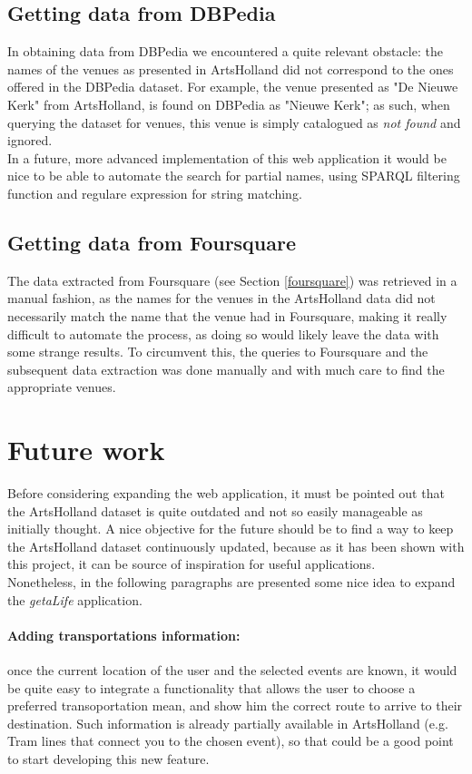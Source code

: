 \documentclass[hidelinks,a4paper]{article}
\begin{document}
\subsection{Getting data from DBPedia}
In obtaining data from DBPedia we encountered a quite relevant obstacle: the names of the venues as presented in ArtsHolland did not correspond to the ones offered in the DBPedia dataset. For example, the venue presented as "De Nieuwe Kerk" from ArtsHolland, is found on DBPedia as "Nieuwe Kerk"; as such, when querying the dataset for venues, this venue is simply catalogued as \textit{not found} and ignored. \\
\indent In a future, more advanced implementation of this web application it would be nice to be able to automate the search for partial names, using SPARQL filtering function and regulare expression for string matching.

\subsection{Getting data from Foursquare}\label{manual_foursquare}
The data extracted from Foursquare (see Section \ref{foursquare}) was retrieved in a manual fashion, as the names for the venues in the ArtsHolland data did not necessarily match the name that the venue had in Foursquare, making it really difficult to automate the process, as doing so would likely leave the data with some strange results. To circumvent this, the queries to Foursquare and the subsequent data extraction was done manually and with much care to find the appropriate venues.

\section{Future work}\label{future_work}
Before considering expanding the web application, it must be pointed out that the ArtsHolland dataset is quite outdated and not so easily manageable as initially thought. A nice objective for the future should be to find a way to keep the ArtsHolland dataset continuously updated, because as it has been shown with this project, it can be source of inspiration for useful applications.\\
\indent Nonetheless, in the following paragraphs are presented some nice idea to expand the \textit{getaLife} application.

\paragraph{Adding transportations information:}
once the current location of the user and the selected events are known, it would be quite easy to integrate a functionality that allows the user to choose a preferred transoportation mean, and show him the correct route to arrive to their destination. Such information is already partially available in ArtsHolland (e.g. Tram lines that connect you to the chosen event), so that could be a good point to start developing this new feature.
\end{document}
